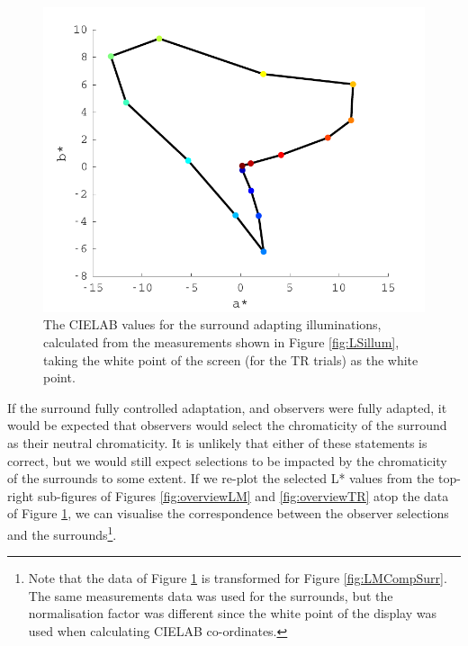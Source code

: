 \begin{figure}[htbp]
\includegraphics[max width=\textwidth]{figs/LargeSphere/adapter1.pdf}
\caption{The CIELAB values for the surround adapting illuminations, calculated from the measurements shown in Figure \ref{fig:LSillum}, taking the white point of the screen (for the TR trials) as the white point.}
\label{fig:adapter1}
\end{figure}

If the surround fully controlled adaptation, and observers were fully adapted, it would be expected that observers would select the chromaticity of the surround as their neutral chromaticity. It is unlikely that either of these statements is correct, but we would still expect selections to be impacted by the chromaticity of the surrounds to some extent. If we re-plot the selected L* values from the top-right sub-figures of Figures \ref{fig:overviewLM} and \ref{fig:overviewTR} atop the data of Figure \ref{fig:adapter1}, we can visualise the correspondence between the observer selections and the surrounds\footnote{Note that the data of Figure \ref{fig:adapter1} is transformed for Figure \ref{fig:LMCompSurr}. The same measurements data was used for the surrounds, but the normalisation factor was different since the white point of the display was used when calculating CIELAB co-ordinates.}.

